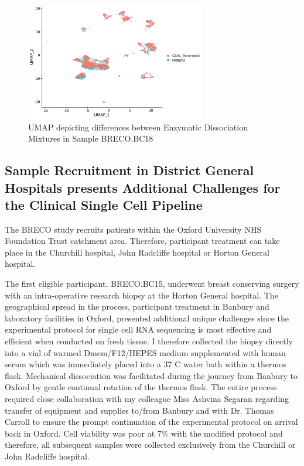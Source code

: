\begin{figure}
	\centering
	\includegraphics[width=0.7\textwidth]{figures/bro18_dissociation_miltenyi_vs_cshl.png} 
	\caption[Comparison of Dissociation Mixtures.]{UMAP depicting differences between Enzymatic Dissociation Mixtures in Sample BRECO.BC18}
	\label{fig:bro18_dissociation_miltenyi_vs_cshl}
\end{figure}



\subsection{Sample Recruitment in District General Hospitals presents Additional Challenges for the Clinical Single Cell Pipeline}

The BRECO study recruits patients within the Oxford University NHS Foundation Trust catchment area. Therefore, participant treatment can take place in the Churchill hospital, John Radcliffe hospital or Horton General hospital.

The first eligible participant, BRECO.BC15, underwent breast conserving surgery with an intra-operative research biopsy at the Horton General hospital. The geographical spread in the process, participant treatment in Banbury and laboratory facilities in Oxford, presented additional unique challenges since the experimental protocol for single cell RNA sequencing is most effective and efficient when conducted on fresh tissue. I therefore collected the biopsy directly into a vial of warmed Dmem/F12/HEPES medium supplemented with human serum which was immediately placed into a 37 \textdegree{}C water bath within a thermos flask. Mechanical dissociation was facilitated during the journey from Banbury to Oxford by gentle continual rotation of the thermos flask. The entire process required close collaboration with my colleague Miss Ashvina Segaran regarding transfer of equipment and supplies to/from Banbury and with Dr. Thomas Carroll to ensure the prompt continuation of the experimental protocol on arrival back in Oxford. Cell viability was poor at 7\% with the modified protocol and therefore, all subsequent samples were collected exclusively from the Churchill or John Radcliffe hospital.

